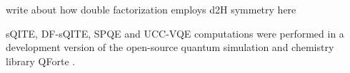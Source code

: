 \documentclass[aip,jcp,amsmath,amssymb, reprint]{revtex4-1}
\begin{document}
write about how double factorization employs d2H symmetry here


sQITE, DF-sQITE, SPQE and UCC-VQE computations were performed in a development version of the open-source quantum simulation and chemistry library QForte \cite{stair2021qforte}. 

\end{document}
